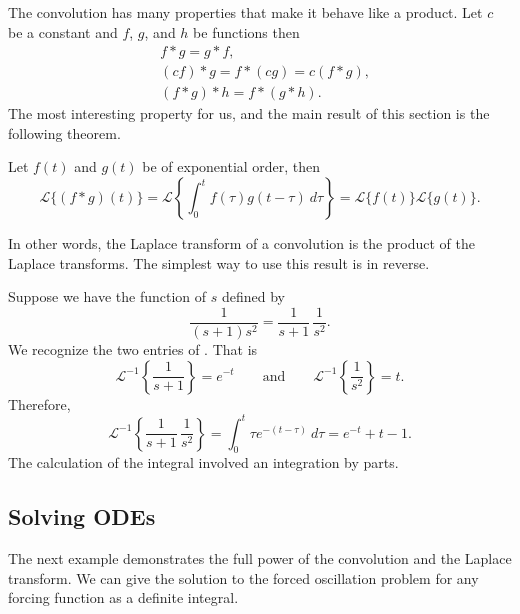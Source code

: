 The convolution has many properties that make it behave like a product.
Let $c$ be a constant and $f$, $g$, and $h$ be functions then
\begin{align*}
& f * g = g * f , \\
& (c f) * g = f * (c g) = c (f*g) , \\
& ( f * g ) * h = f * ( g * h ) .
\end{align*}
The most interesting property for us, and
the main result of this section is the following theorem.

\begin{theorem}
Let $f(t)$ and $g(t)$ be of exponential order, then
\begin{equation*}
\boxed{~~
\mathcal{L} \bigl\{ (f*g)(t) \bigr\}
=
\mathcal{L} \left\{ \int_0^t f(\tau) g(t-\tau) ~ d\tau \right\}
=
\mathcal{L} \bigl\{ f(t) \bigr\} \mathcal{L} \bigl\{ g(t) \bigr\} .
~~}
\end{equation*}
\end{theorem}

In other words, the Laplace transform of a convolution is the product
of the Laplace transforms.  The simplest way to use this result is in
reverse.

\begin{example}
Suppose we have the function of $s$
defined by
\begin{equation*}
\frac{1}{(s+1)s^2} = 
\frac{1}{s+1}\,
\frac{1}{s^2} .
\end{equation*}
We recognize the two entries of .  That is
\begin{equation*}
\mathcal{L}^{-1} 
\left\{
\frac{1}{s+1} \right\}
= e^{-t}
\qquad \text{and} \qquad
\mathcal{L}^{-1} 
\left\{
\frac{1}{s^2} \right\} 
= t.
\end{equation*}
Therefore,
\begin{equation*}
\mathcal{L}^{-1}
\left\{
\frac{1}{s+1}\,
\frac{1}{s^2} \right\}
=
\int_0^t
\tau e^{-(t-\tau)} ~d\tau
=
e^{-t}+t-1 .
\end{equation*}
The calculation of the integral involved an integration by parts.
\end{example}

\subsection{Solving ODEs}

The next example demonstrates the full power of the convolution and
the Laplace transform.  We can give the solution to
the forced oscillation problem for any forcing function as a definite
integral.

